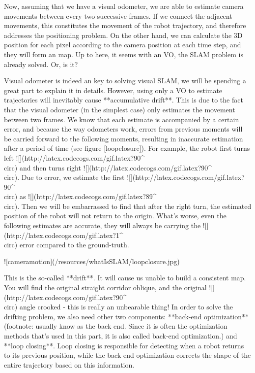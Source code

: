 Now, assuming that we have a visual odometer, we are able to estimate camera movements between every two successive frames. If we connect the adjacent movements, this constitutes the movement of the robot trajectory, and therefore addresses the positioning problem. On the other hand, we can calculate the 3D position for each pixel according to the camera position at each time step, and they will form an map. Up to here, it seems with an VO, the SLAM problem is already solved. Or, is it?

Visual odometer is indeed an key to solving visual SLAM, we will be spending a great part to explain it in details. However, using only a VO to estimate trajectories will inevitably cause **accumulative drift**. This is due to the fact that the visual odometer (in the simplest case) only estimates the movement between two frames. We know that each estimate is accompanied by a certain error, and because the way odometers work, errors from previous moments will be carried forward to the following moments, resulting in inaccurate estimation after a period of time (see figure [loopclosure]). For example, the robot first turns left ![](http://latex.codecogs.com/gif.latex?90^\\circ) and then turns right ![](http://latex.codecogs.com/gif.latex?90^\\circ). Due to error, we estimate the first ![](http://latex.codecogs.com/gif.latex?90^\\circ) as ![](http://latex.codecogs.com/gif.latex?89^\\circ). Then we will be embarrassed to find that after the right turn, the estimated position of the robot will not return to the origin. What's worse, even the following estimates are accurate, they will always be carrying the ![](http://latex.codecogs.com/gif.latex?1^\\circ) error compared to the ground-truth.

![cameramotion](/resources/whatIsSLAM/loopclosure.jpg)

This is the so-called **drift**. It will cause us unable to build a consistent map. You will find the original straight corridor oblique, and the original ![](http://latex.codecogs.com/gif.latex?90^\\circ) angle crooked - this is really an unbearable thing! In order to solve the drifting problem, we also need other two components: **back-end optimization** (footnote: usually know as the back end. Since it is often the optimization methods that's used in this part, it is also called back-end optimization.) and **loop closing**. Loop closing is responsible for detecting when a robot returns to its previous position, while the back-end optimization corrects the shape of the entire trajectory based on this information.


